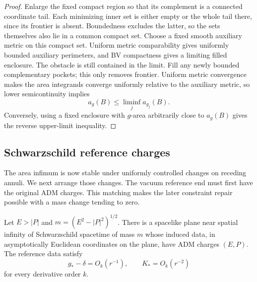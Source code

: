 \begin{proof}
Enlarge the fixed compact region so that its complement is a connected
coordinate tail. Each minimizing inner set is either empty or the whole
tail there, since its frontier is absent. Boundedness excludes the latter,
so the sets themselves also lie in a common compact set.
Choose a fixed smooth auxiliary metric on this compact set. Uniform
metric comparability gives uniformly bounded auxiliary perimeters, and
BV compactness gives a limiting filled enclosure. The obstacle is still
contained in the limit. Fill any newly bounded complementary pockets;
this only removes frontier. Uniform metric convergence makes the area
integrands converge uniformly relative to the auxiliary metric, so lower
semicontinuity implies
\[
 a_g(B)\le\liminf_j a_{g_j}(B).
\]
Conversely, using a fixed enclosure with $g$-area arbitrarily close to
$a_g(B)$ gives the reverse upper-limit inequality.
\end{proof}

\subsection{Schwarzschild reference charges}

The area infimum is now stable under uniformly controlled changes on
receding annuli. We next arrange those changes. The vacuum reference end
must first have the original ADM charges. This matching makes the later
constraint repair possible with a mass change tending to zero.

\begin{lemma}
\label{n3:reduction:boosted-reference}
Let $E>|P|$ and $m=(E^2-|P|^2)^{1/2}$.  There is a spacelike plane
near spatial infinity of Schwarzschild spacetime of mass $m$ whose
induced data, in asymptotically Euclidean coordinates on the plane,
have ADM charges $(E,P)$.  The reference data satisfy
\[
 g_*-\delta=O_k(r^{-1}),\qquad K_*=O_k(r^{-2})
\]
for every derivative order $k$.
\end{lemma}

